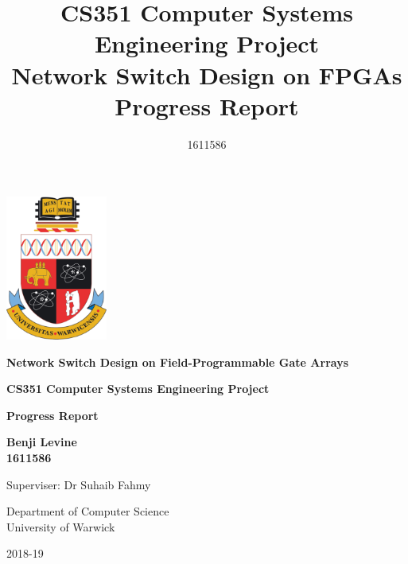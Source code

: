 \begin{titlepage}
   \begin{center}

      \includegraphics[width=0.25\textwidth]{warwick_logo_old.png}

      \vspace{1.5cm}
      \textbf{\Large{Network Switch Design on Field-Programmable Gate Arrays}}

      \vspace{1cm}
      \textbf{\large{CS351 Computer Systems Engineering Project}} \\
      \vspace{0.5cm}


      \textbf{\large{Progress Report}}

      \vspace{2.7cm}

      \textbf{Benji Levine} \\
      \vspace{0.1cm}
      \textbf{1611586}

      \vspace{2.7cm}

      Superviser: Dr Suhaib Fahmy

      \vspace{0.8cm}

      Department of Computer Science\\
      University of Warwick

      \vspace{0.7cm}

      2018-19

   \end{center}
\end{titlepage}


\title{CS351 Computer Systems Engineering Project \\ \vspace{0.5cm} Network Switch Design on FPGAs \\ \vspace{0.3cm} \Large{Progress Report}}
\author{1611586}
